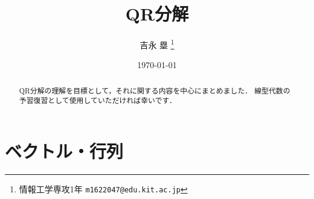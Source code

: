 \documentclass[dvipdfmx]{jsarticle}
\title{QR分解}
\author{吉永 塁 \thanks{情報工学専攻1年 \texttt{m1622047@edu.kit.ac.jp}}}
\date{\today}
\theoremstyle{definition}
\begin{document}
\maketitle

\begin{abstract}
    QR分解の理解を目標として，それに関する内容を中心にまとめました．
    線型代数の予習復習として使用していただければ幸いです．
\end{abstract}


\section{ベクトル・行列}  \label{sec_vecmat}

\end{document}

